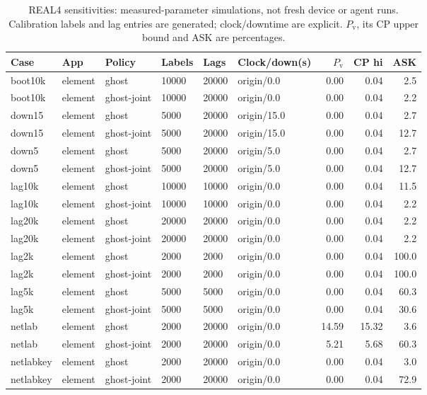 \begin{table}[!htbp]
\centering
\caption{REAL4 sensitivities: measured-parameter simulations, not fresh device or agent runs.
Calibration labels and lag entries are generated; clock/downtime are explicit.
$P_{\mathrm v}$, its CP upper bound and ASK are percentages.}
\label{tab:real4}
\scriptsize
\begin{tabular}{@{}llllllrrr@{}}
\toprule
Case & App & Policy & Labels & Lags & Clock/down(s) & $P_{\mathrm v}$ & CP hi & ASK \\
\midrule
boot10k & element & ghost & 10000 & 20000 & origin/0.0 & 0.00 & 0.04 & 2.5 \\
boot10k & element & ghost-joint & 10000 & 20000 & origin/0.0 & 0.00 & 0.04 & 2.2 \\
down15 & element & ghost & 5000 & 20000 & origin/15.0 & 0.00 & 0.04 & 2.7 \\
down15 & element & ghost-joint & 5000 & 20000 & origin/15.0 & 0.00 & 0.04 & 12.7 \\
down5 & element & ghost & 5000 & 20000 & origin/5.0 & 0.00 & 0.04 & 2.7 \\
down5 & element & ghost-joint & 5000 & 20000 & origin/5.0 & 0.00 & 0.04 & 12.7 \\
lag10k & element & ghost & 10000 & 10000 & origin/0.0 & 0.00 & 0.04 & 11.5 \\
lag10k & element & ghost-joint & 10000 & 10000 & origin/0.0 & 0.00 & 0.04 & 2.2 \\
lag20k & element & ghost & 20000 & 20000 & origin/0.0 & 0.00 & 0.04 & 2.2 \\
lag20k & element & ghost-joint & 20000 & 20000 & origin/0.0 & 0.00 & 0.04 & 2.2 \\
lag2k & element & ghost & 2000 & 2000 & origin/0.0 & 0.00 & 0.04 & 100.0 \\
lag2k & element & ghost-joint & 2000 & 2000 & origin/0.0 & 0.00 & 0.04 & 100.0 \\
lag5k & element & ghost & 5000 & 5000 & origin/0.0 & 0.00 & 0.04 & 60.3 \\
lag5k & element & ghost-joint & 5000 & 5000 & origin/0.0 & 0.00 & 0.04 & 30.6 \\
netlab & element & ghost & 2000 & 20000 & origin/0.0 & 14.59 & 15.32 & 3.6 \\
netlab & element & ghost-joint & 2000 & 20000 & origin/0.0 & 5.21 & 5.68 & 60.3 \\
netlabkey & element & ghost & 2000 & 20000 & origin/0.0 & 0.00 & 0.04 & 3.0 \\
netlabkey & element & ghost-joint & 2000 & 20000 & origin/0.0 & 0.00 & 0.04 & 72.9 \\

\end{tabular}
\end{table}
